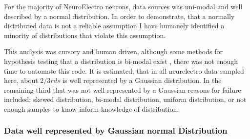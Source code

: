 %    
%
%
%

%
For the majority of NeuroElectro neurons, data sources was uni-modal and well described by a normal distribution. In order to demonstrate, that a normally distributed data is not a reliable assumption I have humanely identified a minority of distributions that violate this assumption.


This analysis was cursory and human driven, although some methods for hypothesis testing that a distribution is bi-modal exist \cite{maechler2013package}, there was not enough time to automate this code. It is estimated, that in all neurelectro data sampled here, about $2/3rds$ is well represented by a Gaussian distribution. In the remaining third that was not well represented by a Gaussian reasons for failure included: skewed distribution, bi-modal distribution, uniform distribution, or not enough samples to know inform knowledge of distribution.


\subsubsection{Data well represented by Gaussian normal Distribution}    

